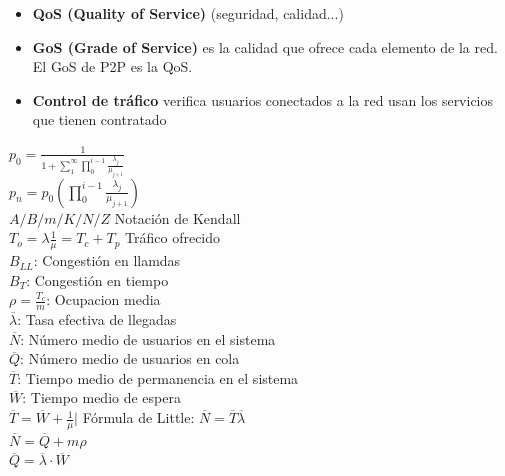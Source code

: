 \vfill\null
\columnbreak
{}
\begin{minipage}{.22\textwidth}
	\begin{itemize}[leftmargin=*]
		\item {\bf QoS (Quality of Service)} (seguridad, calidad...)
		\item {\bf GoS (Grade of Service)} es la calidad que ofrece cada elemento de la red. El GoS de P2P es la QoS.
		\item {\bf Control de tráfico} verifica usuarios conectados a la red usan los servicios que tienen contratado
	\end{itemize}
\end{minipage}

\begin{minipage}{.22\textwidth}
	$p_0=\frac{1}{1+{\sum_{1}^{\infty}\prod_{0}^{i-1}}\frac{\lambda_j}{\mu_{j+1}}}$ \\
	$p_n=p_0(\prod_{0}^{i-1}\frac{\lambda_j}{\mu_{j+1}})$ \\
	$A/B/m/K/N/Z$ Notación de Kendall \\
	$T_o = \lambda \frac{1}{\mu} = T_c + T_p$ Tráfico ofrecido\\
	$B_{LL}$: Congestión en llamdas\\
	$B_{T}$: Congestión en tiempo\\
	$\rho = \frac{T_c}{m}$: Ocupacion media\\
	$\overline{\lambda}$: Tasa efectiva de llegadas\\
	$\overline{N}$: Número medio de usuarios en el sistema\\
	$\overline{Q}$: Número medio de usuarios en cola\\
	$\overline{T}$: Tiempo medio de permanencia en el sistema\\
	$\overline{W}$: Tiempo medio de espera\\
	$\overline{T} =\overline{W}+\frac{1}{\mu}|$ Fórmula de Little: $\overline{N} =\overline{T}\overline{\lambda}$\\
	$\overline{N} = \overline{Q} + m{\rho}$\\
	$\overline{Q} = \overline{\lambda} \cdot \overline{W} $\\
\end{minipage}

